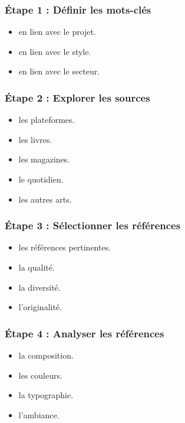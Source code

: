 \subsubsection{Étape 1 : Définir les mots-clés}

\begin{itemize}
    \item {} en lien avec le projet.
    \item {} en lien avec le style.
    \item {} en lien avec le secteur.
\end{itemize}

\subsubsection{Étape 2 : Explorer les sources}

\begin{itemize}
    \item {} les plateformes.
    \item {} les livres.
    \item {} les magazines.
    \item {} le quotidien.
    \item {} les autres arts.
\end{itemize}

\subsubsection{Étape 3 : Sélectionner les références}

\begin{itemize}
    \item {} les références pertinentes.
    \item {} la qualité.
    \item {} la diversité.
    \item {} l'originalité.
\end{itemize}

\subsubsection{Étape 4 : Analyser les références}

\begin{itemize}
    \item {} la composition.
    \item {} les couleurs.
    \item {} la typographie.
    \item {} l'ambiance.
\end{itemize}


